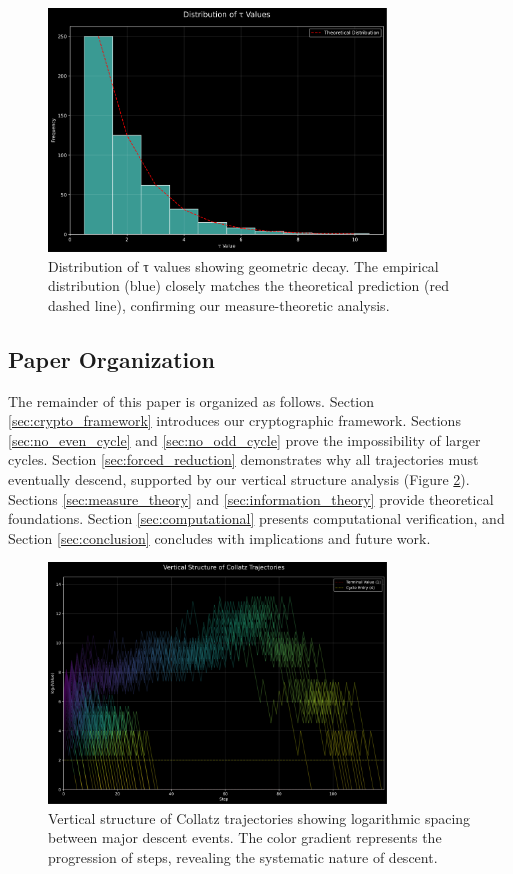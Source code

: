 \begin{figure}[h]
\centering
\includegraphics[width=0.8\textwidth]{figures/tau_distribution.svg}
\caption{Distribution of τ values showing geometric decay. The empirical distribution (blue) closely matches the theoretical prediction (red dashed line), confirming our measure-theoretic analysis.}
\label{fig:tau_distribution}
\end{figure}

\subsection{Paper Organization}
The remainder of this paper is organized as follows. Section \ref{sec:crypto_framework} introduces our cryptographic framework. Sections \ref{sec:no_even_cycle} and \ref{sec:no_odd_cycle} prove the impossibility of larger cycles. Section \ref{sec:forced_reduction} demonstrates why all trajectories must eventually descend, supported by our vertical structure analysis (Figure \ref{fig:vertical_structure}). Sections \ref{sec:measure_theory} and \ref{sec:information_theory} provide theoretical foundations. Section \ref{sec:computational} presents computational verification, and Section \ref{sec:conclusion} concludes with implications and future work.

\begin{figure}[h]
\centering
\includegraphics[width=0.8\textwidth]{figures/vertical_structure.svg}
\caption{Vertical structure of Collatz trajectories showing logarithmic spacing between major descent events. The color gradient represents the progression of steps, revealing the systematic nature of descent.}
\label{fig:vertical_structure}
\end{figure} 